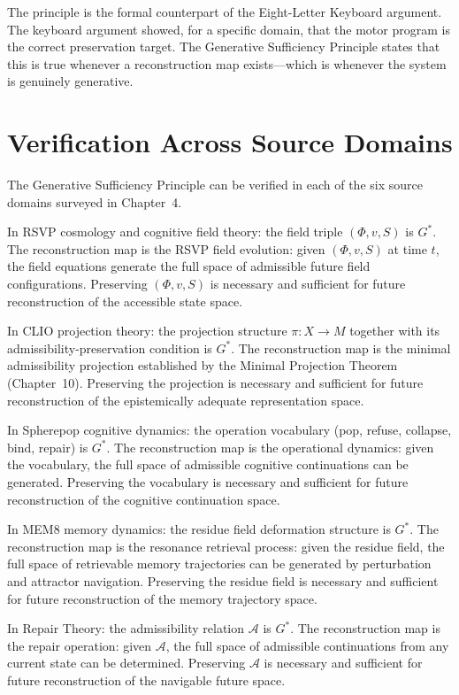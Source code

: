 \documentclass[12pt, oneside]{book}
\theoremstyle{flyxion}
\theoremstyle{definition}
\begin{document}
The principle is the formal counterpart of the Eight-Letter
Keyboard argument. The keyboard argument showed, for a
specific domain, that the motor program is the correct
preservation target. The Generative Sufficiency Principle
states that this is true whenever a reconstruction map
exists---which is whenever the system is genuinely generative.

\section{Verification Across Source Domains}

The Generative Sufficiency Principle can be verified in each
of the six source domains surveyed in Chapter~4.

In RSVP cosmology and cognitive field theory: the field
triple $(\Phi, v, S)$ is $G^*$. The reconstruction map
is the RSVP field evolution: given $(\Phi, v, S)$ at time
$t$, the field equations generate the full space of
admissible future field configurations. Preserving $(\Phi,
v, S)$ is necessary and sufficient for future reconstruction
of the accessible state space.

In CLIO projection theory: the projection structure
$\pi : X \to M$ together with its admissibility-preservation
condition is $G^*$. The reconstruction map is the minimal
admissibility projection established by the Minimal
Projection Theorem (Chapter~10). Preserving the projection
is necessary and sufficient for future reconstruction of
the epistemically adequate representation space.

In Spherepop cognitive dynamics: the operation vocabulary
(pop, refuse, collapse, bind, repair) is $G^*$. The
reconstruction map is the operational dynamics: given the
vocabulary, the full space of admissible cognitive
continuations can be generated. Preserving the vocabulary
is necessary and sufficient for future reconstruction of
the cognitive continuation space.

In MEM\textbar{}8 memory dynamics: the residue field
deformation structure is $G^*$. The reconstruction map is
the resonance retrieval process: given the residue field,
the full space of retrievable memory trajectories can be
generated by perturbation and attractor navigation.
Preserving the residue field is necessary and sufficient
for future reconstruction of the memory trajectory space.

In Repair Theory: the admissibility relation $\mathcal{A}$
is $G^*$. The reconstruction map is the repair operation:
given $\mathcal{A}$, the full space of admissible
continuations from any current state can be determined.
Preserving $\mathcal{A}$ is necessary and sufficient for
future reconstruction of the navigable future space.
\end{document}
